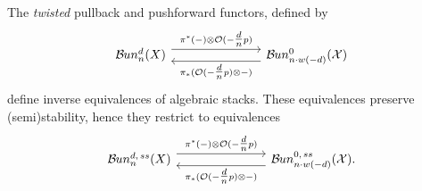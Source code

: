 \documentclass{article}
\begin{document}
\begin{thm} \label{thm: equivalence for Bun}
The \textit{twisted} pullback and pushforward functors, defined by
\begin{equation} \label{equivalence bun}
\begin{tikzcd}
	{\Bun_n^d(X)} &&& {\Bun_{n \cdot w(-d)}^0(\mc{X})}
	\arrow["{\pi^*(-) \otimes \O(-\tfrac{d}{n}p)}", shift left=2, from=1-1, to=1-4]
	\arrow["{\pi_*(\O(-\tfrac{d}{n}p) \otimes -)}", shift left=2, from=1-4, to=1-1]
\end{tikzcd}
\end{equation}
define inverse equivalences of algebraic stacks. These equivalences preserve (semi)stability, hence they restrict to equivalences
\[\begin{tikzcd}
	{\Bun_n^{d, \, ss}(X)} &&& {\Bun_{n \cdot w(-d)}^{0, \, ss}(\mc{X}).}
	\arrow["{\pi^*(-) \otimes \O(-\tfrac{d}{n}p)}", shift left=2, from=1-1, to=1-4]
	\arrow["{\pi_*(\O(-\tfrac{d}{n}p) \otimes -)}", shift left=2, from=1-4, to=1-1]
\end{tikzcd}\]
\end{thm}
\end{document}
